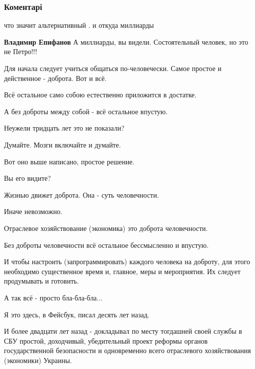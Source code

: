  
 
 
 
 
\subsubsection{Коментарі}
\label{sec:04_12_2021.fb.zharkih_denis.1.politika_tendencii.cmt}

\begin{itemize} %
что значит альтернативный . и откуда миллиарды

\textbf{Владимир Епифанов} А миллиарды, вы видели. Состоятельный человек, но это не Петро!!!


Для начала следует учиться общаться по-человечески. Самое простое и действенное
- доброта. Вот и всё.

Всё остальное само собою естественно приложится в достатке.

А без доброты между собой - всё остальное впустую.

Неужели тридцать лет это не показали?

Думайте. Мозги включайте и думайте.

Вот оно выше написано, простое решение.

Вы его видите?

Жизнью движет доброта. Она - суть человечности.

Иначе невозможно.

Отраслевое хозяйствование (экономика) это доброта человечности.

Без доброты человечности всё остальное бессмысленно и впустую.

И чтобы настроить (запрограммировать) каждого человека на доброту, для этого
необходимо существенное время и, главное, меры и мероприятия. Их следует
продумывать и готовить.

А так всё - просто бла-бла-бла...

Я это здесь, в Фейсбук, писал десять лет назад.

И более двадцати лет назад - докладывал по месту тогдашней своей службы в СБУ
простой, доходчивый, убедительный проект реформы органов государственной
безопасности и одновременно всего отраслевого хозяйствования (экономики)
Украины.


\end{itemize}
